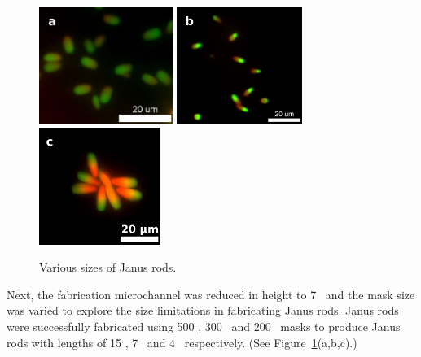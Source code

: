 \begin{figure}
\begin{center}
\includegraphics[height=1.5in]{figures/rods/janus-rods-4x2um.png}
\includegraphics[height=1.5in]{figures/rods/janus-rods-6x2um.png}
\includegraphics[height=1.5in]{figures/rods/janus-rod-cluster-zoom.png}
\end{center}
\caption{Various sizes of Janus rods.}
\label{fig:janus-sizes}
\end{figure}

Next, the fabrication microchannel was reduced in height to 7 \microns~and the mask size was varied to explore the
size limitations in fabricating Janus rods.  Janus rods were successfully fabricated 
using 500 \microns, 300 \microns~and 200 \microns~masks to produce Janus rods with lengths of 
15 \microns, 7 \microns~and 4 \microns~respectively. (See Figure~\ref{fig:janus-sizes}(a,b,c).)


